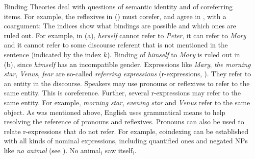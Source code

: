 \documentclass[output=paper,biblatex,babelshorthands,newtxmath,draftmode,colorlinks,citecolor=brown]{langscibook}
\begin{document}
Binding Theories deal with questions of semantic identity and  of coreferring
items. For example, the reflexives in () must corefer, and agree in , with a
coargument:
\eal
\label{ex-binding-reflexives}
\zl
The indices show what bindings are possible and which ones are ruled out. For example, in
(a), \emph{herself} cannot refer to \emph{Peter}, it can refer to \emph{Mary} and it cannot
refer to some discourse referent that is not mentioned in the sentence (indicated by the index
$k$). Binding of \emph{himself} to \emph{Mary} is ruled out in (b), since \emph{himself}
has an incompatible gender. Expressions like \emph{Mary}, \emph{the morning star}, \emph{Venus}, \emph{fear} are
so-called \emph{referring expressions} (r-expressions, \citealt[]{Chomsky81a}). They refer to an entity in the discourse. Speakers
may use pronouns or reflexives to refer to the same entity. This is coreference.
Further, several r-expressions may refer to the same entity. For example, \emph{morning star}, \emph{evening
  star} and \emph{Venus} refer to the same object. As was mentioned above, English uses
grammatical means to help resolving the reference of pronouns and reflexives. Pronouns can also be
used to relate r-expressions that do not refer. For example, coindexing can be established with all kinds of nominal expressions, including
quantified ones and negated NPs like \emph{no animal} (see \citealp[--129]{BP80a}).
\ea
No animal$_i$ saw itself$_i$.
\z
{}
\end{document}
